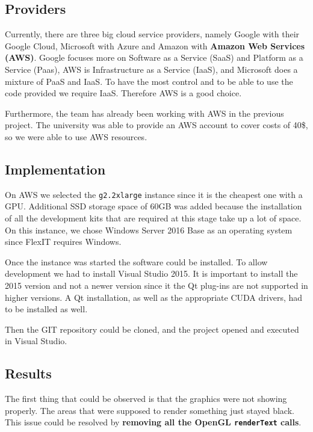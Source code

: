 \documentclass[a4paper, 11pt, article]{report}
\begin{document}
\subsection{Providers}

Currently, there are three big cloud service providers, namely Google with their Google Cloud, Microsoft with Azure and Amazon with \textbf{Amazon Web Services (AWS)}. Google focuses more on Software as a Service (SaaS) and Platform as a Service (Paas), AWS is Infrastructure as a Service (IaaS), and Microsoft does a mixture of PaaS and IaaS. To have the most control and to be able to use the code provided we require IaaS. Therefore AWS is a good choice.

Furthermore, the team has already been working with AWS in the previous project. The university was able to provide an AWS account to cover costs of 40\$, so we were able to use AWS resources. 

\subsection{Implementation}

On AWS we selected the \texttt{g2.2xlarge} instance since it is the cheapest one with a GPU. Additional SSD storage space of 60GB was added because the installation of all the development kits that are required at this stage take up a lot of space. On this instance, we chose Windows Server 2016 Base as an operating system since FlexIT requires Windows. 

Once the instance was started the software could be installed. To allow development we had to install Visual Studio 2015. It is important to install the 2015 version and not a newer version since it the Qt plug-ins are not supported in higher versions. A Qt installation, as well as the appropriate CUDA drivers, had to be installed as well. 

Then the GIT repository could be cloned, and the project opened and executed in Visual Studio. 

\subsection{Results}

The first thing that could be observed is that the graphics were not showing properly. The areas that were supposed to render something just stayed black. This issue could be resolved by \textbf{removing all the OpenGL \texttt{renderText} calls}. 
\end{document}
